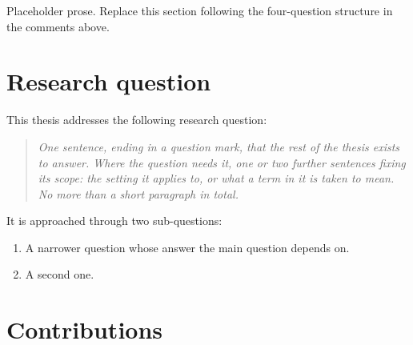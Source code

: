 Placeholder prose. Replace this section following the four-question structure
in the comments above.

\section{Research question}
\label{sec:research_question}

%
%

This thesis addresses the following research question:
\begin{quote}
  \emph{One sentence, ending in a question mark, that the rest of the thesis
  exists to answer. Where the question needs it, one or two further sentences
  fixing its scope: the setting it applies to, or what a term in it is taken to
  mean. No more than a short paragraph in total.}
\end{quote}
It is approached through two sub-questions:
\begin{enumerate}[itemsep=2pt,topsep=4pt]
  \item A narrower question whose answer the main question depends on.
  \item A second one.
\end{enumerate}

\section{Contributions}
\label{sec:contributions}

